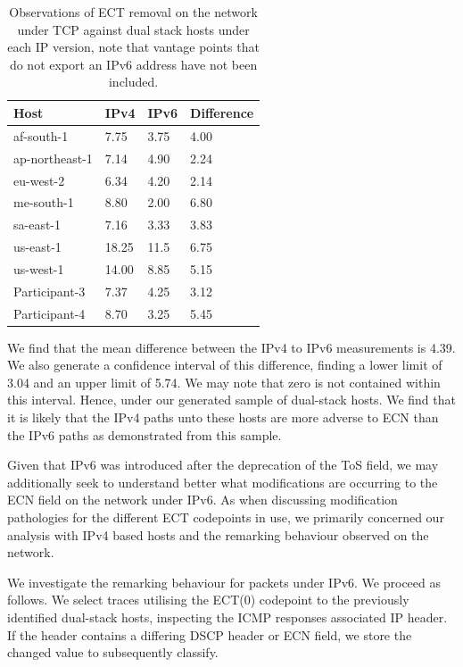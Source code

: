\documentclass{l4proj}
\begin{document}
\begin{table}[H]
\centering
\begin{tabular}{|l|l|l|l|}
\hline
Host           & IPv4  & IPv6 & Difference \\ \hline
af-south-1     & 7.75  & 3.75 & 4.00      \\ \hline
ap-northeast-1 & 7.14  & 4.90 & 2.24       \\ \hline
eu-west-2      & 6.34  & 4.20 & 2.14       \\ \hline
me-south-1     & 8.80  & 2.00 & 6.80        \\ \hline
sa-east-1      & 7.16  & 3.33 & 3.83       \\ \hline
us-east-1      & 18.25 & 11.5 & 6.75       \\ \hline
us-west-1      & 14.00 & 8.85 & 5.15       \\ \hline
Participant-3   & 7.37  & 4.25 & 3.12       \\ \hline
Participant-4  & 8.70  & 3.25 & 5.45       \\ \hline
\end{tabular}
\caption{Observations of ECT removal on the network under TCP against dual stack hosts under each IP version, note that vantage points that do not export an IPv6 address have not been included.}
\label{tab:ip46}
\end{table}

We find that the mean difference between the IPv4 to IPv6 measurements is 4.39. We also generate a confidence interval of this difference, finding a lower limit of 3.04 and an upper limit of 5.74. We may note that zero is not contained within this interval. Hence, under our generated sample of dual-stack hosts. We find that it is likely that the IPv4 paths unto these hosts are more adverse to ECN than the IPv6 paths as demonstrated from this sample.

Given that IPv6 was introduced after the deprecation of the ToS field, we may additionally seek to understand better what modifications are occurring to the ECN field on the network under IPv6. As when discussing modification pathologies for the different ECT codepoints in use, we primarily concerned our analysis with IPv4 based hosts and the remarking behaviour observed on the network.

We investigate the remarking behaviour for packets under IPv6. We proceed as follows. We select traces utilising the ECT(0) codepoint to the previously identified dual-stack hosts, inspecting the ICMP responses associated IP header. If the header contains a differing DSCP header or ECN field, we store the changed value to subsequently classify. 
\end{document}

